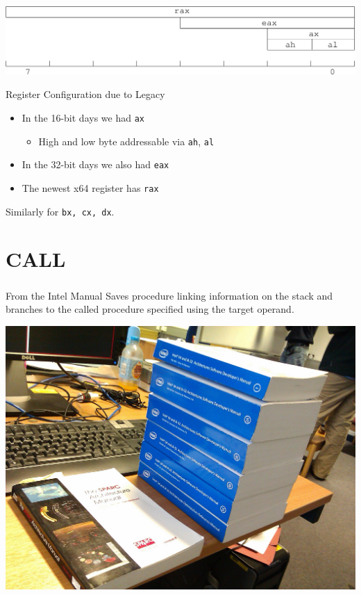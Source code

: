 \documentclass{beamer}
\begin{document}
\begin{frame}
  \frametitle{\insertsection}

  \includegraphics[width=\textwidth]{rax}
  \vfill

\begin{block}{Register Configuration due to Legacy}
  \begin{itemize}
    \item In the 16-bit days we had \texttt{ax}
      \begin{itemize}
        \item High and low byte addressable via \texttt{ah}, \texttt{al}
      \end{itemize}
    \item In the 32-bit days we also had \texttt{eax}
    \item The newest x64 register has \texttt{rax}
  \end{itemize}
\end{block}

\begin{center}
Similarly for \texttt{bx, cx, dx}.
\end{center}

\end{frame}



\section{CALL}
\begin{frame}
  \frametitle{\insertsection}

  \begin{block}{From the Intel Manual}
    Saves procedure linking information on the stack and branches to the called
procedure specified using the target operand.
  \end{block}

  \vfill

  \begin{center}
  \includegraphics[width=.5\textwidth]{manual.jpg}
  \end{center}

\end{frame}
\end{document}
